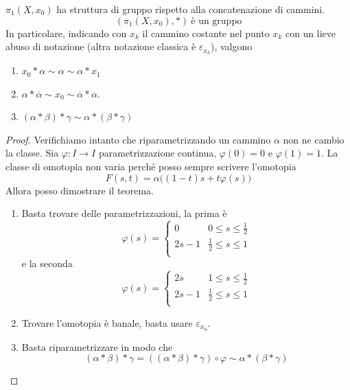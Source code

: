 \begin{theorem}
	$\pi_1(X, x_0)$ ha struttura di gruppo rispetto alla concatenazione di cammini. 
	\begin{equation*}
	(\pi_1(X, x_0), *) \ \text{è un gruppo}
	\end{equation*}
	In particolare, indicando con $x_k$ il cammino costante nel punto $x_k$ con un lieve abuso di notazione (altra notazione classica è $\varepsilon_{x_k}$), valgono
	\begin{enumerate}
		\item $x_0 * \alpha \sim \alpha \sim \alpha * x_1$
		\item $\alpha * \overline{\alpha} \sim x_0 \sim \overline{\alpha} * \alpha$.
		\item $(\alpha * \beta) * \gamma \sim \alpha * (\beta * \gamma)$
	\end{enumerate} 
\end{theorem}
\begin{proof} Verifichiamo intanto che riparametrizzando un cammino $\alpha$ non ne cambio la classe. Sia $\varphi:I \to I$ parametrizzazione continua, $\varphi(0)=0$ e $\varphi(1)=1$. La classe di omotopia non varia perché posso sempre scrivere l'omotopia
	\begin{equation*}
	F(s,t)=\alpha\big((1-t)s+t\varphi(s) \big)
	\end{equation*} 
	Allora posso dimostrare il teorema.
	\begin{enumerate}
		\item Basta trovare delle parametrizzazioni, la prima è
		\begin{equation*}
		\varphi(s)=
		\begin{cases}
		0 &  0 \leq s \leq \frac{1}{2}\\
		2s-1 &  \frac{1}{2} \leq s \leq 1\\
		\end{cases}
		\end{equation*}
		e la seconda 
		\begin{equation*}
		\varphi(s)=
		\begin{cases}
		2s  &  1 \leq s \leq \frac{1}{2}\\
		2s-1 &  \frac{1}{2} \leq s \leq 1\\
		\end{cases}
		\end{equation*}
		\item Trovare l'omotopia è banale, basta usare $\varepsilon_{x_0}$.
		\item Basta riparametrizzare in modo che
		\begin{equation*}
		(\alpha * \beta) * \gamma = \left((\alpha * \beta) * \gamma\right)\circ \varphi \sim \alpha * (\beta * \gamma)
		\end{equation*}
	\end{enumerate}
\end{proof}

